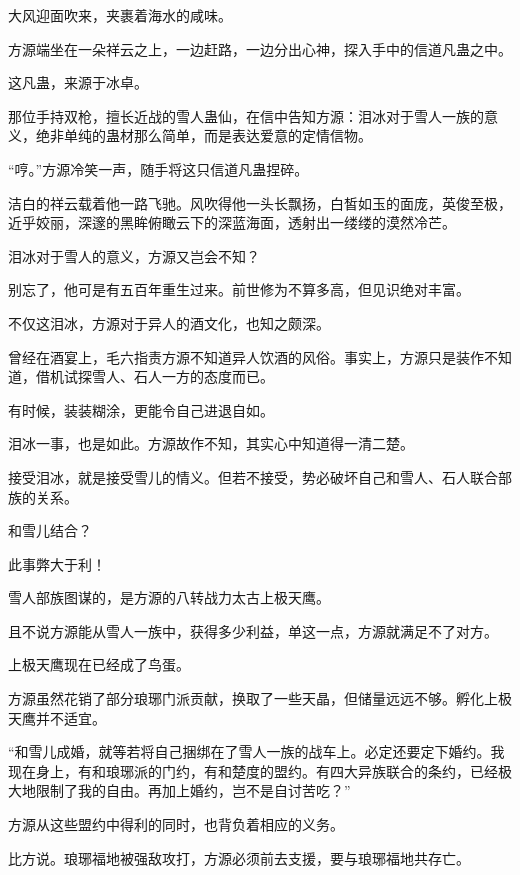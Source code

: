 
\begin{this_body}

大风迎面吹来，夹裹着海水的咸味。

方源端坐在一朵祥云之上，一边赶路，一边分出心神，探入手中的信道凡蛊之中。

这凡蛊，来源于冰卓。

那位手持双枪，擅长近战的雪人蛊仙，在信中告知方源：泪冰对于雪人一族的意义，绝非单纯的蛊材那么简单，而是表达爱意的定情信物。

“哼。”方源冷笑一声，随手将这只信道凡蛊捏碎。

洁白的祥云载着他一路飞驰。风吹得他一头长飘扬，白皙如玉的面庞，英俊至极，近乎姣丽，深邃的黑眸俯瞰云下的深蓝海面，透射出一缕缕的漠然冷芒。

泪冰对于雪人的意义，方源又岂会不知？

别忘了，他可是有五百年重生过来。前世修为不算多高，但见识绝对丰富。

不仅这泪冰，方源对于异人的酒文化，也知之颇深。

曾经在酒宴上，毛六指责方源不知道异人饮酒的风俗。事实上，方源只是装作不知道，借机试探雪人、石人一方的态度而已。

有时候，装装糊涂，更能令自己进退自如。

泪冰一事，也是如此。方源故作不知，其实心中知道得一清二楚。

接受泪冰，就是接受雪儿的情义。但若不接受，势必破坏自己和雪人、石人联合部族的关系。

和雪儿结合？

此事弊大于利！

雪人部族图谋的，是方源的八转战力太古上极天鹰。

且不说方源能从雪人一族中，获得多少利益，单这一点，方源就满足不了对方。

上极天鹰现在已经成了鸟蛋。

方源虽然花销了部分琅琊门派贡献，换取了一些天晶，但储量远远不够。孵化上极天鹰并不适宜。

“和雪儿成婚，就等若将自己捆绑在了雪人一族的战车上。必定还要定下婚约。我现在身上，有和琅琊派的门约，有和楚度的盟约。有四大异族联合的条约，已经极大地限制了我的自由。再加上婚约，岂不是自讨苦吃？”

方源从这些盟约中得利的同时，也背负着相应的义务。

比方说。琅琊福地被强敌攻打，方源必须前去支援，要与琅琊福地共存亡。


\end{this_body}
